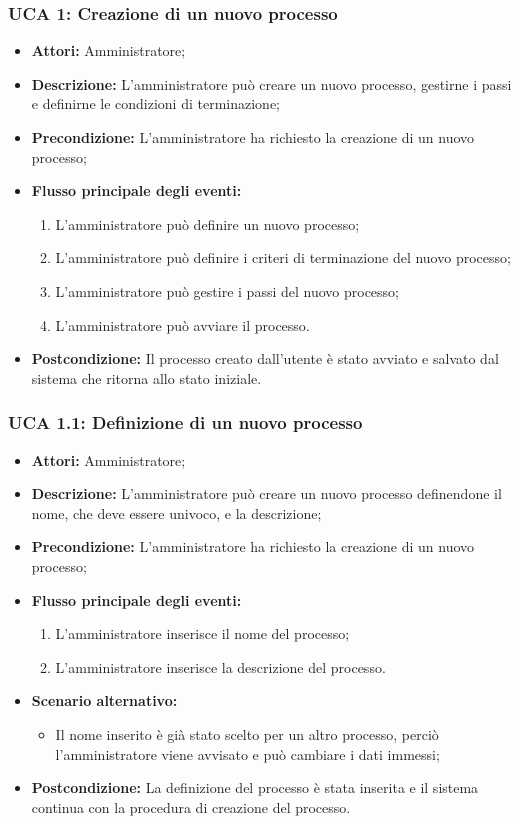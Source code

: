 \subsubsection{UCA 1: Creazione di un nuovo processo}
\begin{itemize}
\item \textbf{Attori:}
 Amministratore;
\item \textbf{Descrizione:} 
L'amministratore può creare un nuovo processo, gestirne i passi e definirne le condizioni di terminazione;
\item \textbf{Precondizione:} L'amministratore ha richiesto la creazione di un nuovo processo;
\item \textbf{Flusso principale degli eventi:} 
\begin{enumerate}
\item L'amministratore può definire un nuovo processo;
\item L'amministratore può definire i criteri di terminazione del nuovo processo;
\item L'amministratore può gestire i passi del nuovo processo;
\item L'amministratore può avviare il processo.
\end{enumerate}
\item \textbf{Postcondizione:} 
Il processo creato dall'utente è stato avviato e salvato dal sistema che ritorna allo stato iniziale.
\end{itemize}

\hypertarget{A1.1}{}
\subsubsection{UCA 1.1: Definizione di un nuovo processo}
\begin{itemize}
\item \textbf{Attori:}
 Amministratore;
\item \textbf{Descrizione:} 
L'amministratore può creare un nuovo processo definendone il nome, che deve essere univoco, e la descrizione;
\item \textbf{Precondizione:} L'amministratore ha richiesto la creazione di un nuovo processo;
\item \textbf{Flusso principale degli eventi:} 
\begin{enumerate}
\item L'amministratore inserisce il nome del processo;
\item L'amministratore inserisce la descrizione del processo.
\end{enumerate}
\item \textbf{Scenario alternativo:}
\begin{itemize}
\item Il nome inserito è già stato scelto per un altro processo, perciò l'amministratore viene avvisato e può cambiare i dati immessi;
\end{itemize}
\item \textbf{Postcondizione:} 
La definizione del processo è stata inserita e il sistema continua con la procedura di creazione del processo.
\end{itemize}

